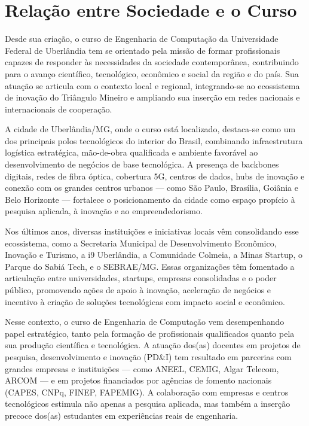 \section{Relação entre Sociedade e o Curso}

Desde sua criação, o curso de Engenharia de Computação da Universidade Federal de Uberlândia tem se orientado pela missão de formar profissionais capazes de responder às necessidades da sociedade contemporânea, contribuindo para o avanço científico, tecnológico, econômico e social da região e do país. Sua atuação se articula com o contexto local e regional, integrando-se ao ecossistema de inovação do Triângulo Mineiro e ampliando sua inserção em redes nacionais e internacionais de cooperação.

A cidade de Uberlândia/MG, onde o curso está localizado, destaca-se como um dos principais polos tecnológicos do interior do Brasil, combinando infraestrutura logística estratégica, mão-de-obra qualificada e ambiente favorável ao desenvolvimento de negócios de base tecnológica. A presença de backbones digitais, redes de fibra óptica, cobertura 5G, centros de dados, hubs de inovação e conexão com os grandes centros urbanos — como São Paulo, Brasília, Goiânia e Belo Horizonte — fortalece o posicionamento da cidade como espaço propício à pesquisa aplicada, à inovação e ao empreendedorismo.

Nos últimos anos, diversas instituições e iniciativas locais vêm consolidando esse ecossistema, como a Secretaria Municipal de Desenvolvimento Econômico, Inovação e Turismo, a i9 Uberlândia, a Comunidade Colmeia, a Minas Startup, o Parque do Sabiá Tech, e o SEBRAE/MG. Essas organizações têm fomentado a articulação entre universidades, startups, empresas consolidadas e o poder público, promovendo ações de apoio à inovação, aceleração de negócios e incentivo à criação de soluções tecnológicas com impacto social e econômico.

Nesse contexto, o curso de Engenharia de Computação vem desempenhando papel estratégico, tanto pela formação de profissionais qualificados quanto pela sua produção científica e tecnológica. A atuação dos(as) docentes em projetos de pesquisa, desenvolvimento e inovação (PD\&I) tem resultado em parcerias com grandes empresas e instituições — como ANEEL, CEMIG, Algar Telecom, ARCOM — e em projetos financiados por agências de fomento nacionais (CAPES, CNPq, FINEP, FAPEMIG). A colaboração com empresas e centros tecnológicos estimula não apenas a pesquisa aplicada, mas também a inserção precoce dos(as) estudantes em experiências reais de engenharia.

